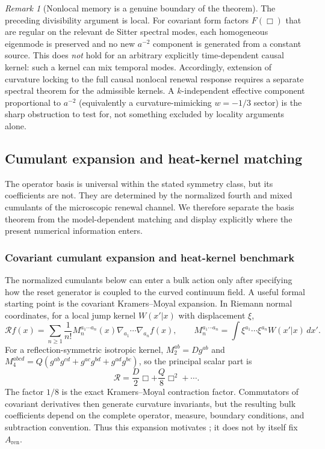 \documentclass[11pt]{article}
\theoremstyle{definition}
\theoremstyle{remark}
\newtheorem{remark}[theorem]{Remark}
\newcommand{\ren}{\mathrm{ren}}
\begin{document}
\begin{remark}[Nonlocal memory is a genuine boundary of the theorem]
\label{rem:nonlocal-curvature-boundary}
The preceding divisibility argument is local.  For covariant form factors
$F(\Box)$ that are regular on the relevant de Sitter spectral modes, each
homogeneous eigenmode is preserved and no new $a^{-2}$ component is generated
from a constant source.  This does \emph{not} hold for an arbitrary
explicitly time-dependent causal kernel: such a kernel can mix temporal modes.
Accordingly, extension of curvature locking to the full causal nonlocal renewal
response requires a separate spectral theorem for the admissible kernels.  A
$k$-independent effective component proportional to $a^{-2}$ (equivalently a
curvature-mimicking $w=-1/3$ sector) is the sharp obstruction to test for, not
something excluded by locality arguments alone.
\end{remark}

\subsection{Cumulant expansion and heat-kernel matching}

The operator basis is universal within the stated symmetry class, but its
coefficients are not.  They are determined by the normalized fourth and mixed
cumulants of the microscopic renewal channel.  We therefore separate the
basis theorem from the model-dependent matching and display explicitly where
the present numerical information enters.

\subsubsection{Covariant cumulant expansion and heat-kernel benchmark}
\label{subsec:reset-action-heat-kernel}

The normalized cumulants below can enter a bulk action only after specifying how
the reset generator is coupled to the curved continuum field.  A useful formal
starting point is the covariant Kramers--Moyal expansion.  In Riemann normal
coordinates, for a local jump kernel $W(x'|x)$ with displacement $\xi$,
\[
 \mathcal R f(x)=\sum_{n\ge1}\frac{1}{n!}
 M_n^{a_1\cdots a_n}(x)\nabla_{a_1}\cdots\nabla_{a_n}f(x),
 \qquad
 M_n^{a_1\cdots a_n}=\int \xi^{a_1}\cdots\xi^{a_n}W(x'|x)\,dx'.
\]
For a reflection-symmetric isotropic kernel,
$M_2^{ab}=Dg^{ab}$ and
$M_4^{abcd}=Q(g^{ab}g^{cd}+g^{ac}g^{bd}+g^{ad}g^{bc})$, so the principal
scalar part is
\[
       \mathcal R=\frac D2\Box+\frac Q8\Box^2+\cdots .
\]
The factor $1/8$ is the exact Kramers--Moyal contraction factor.  Commutators of
covariant derivatives then generate curvature invariants, but the resulting
bulk coefficients depend on the complete operator, measure, boundary
conditions, and subtraction convention.  Thus this expansion motivates
; it does not by itself fix $A_{\ren}$.
\end{document}
